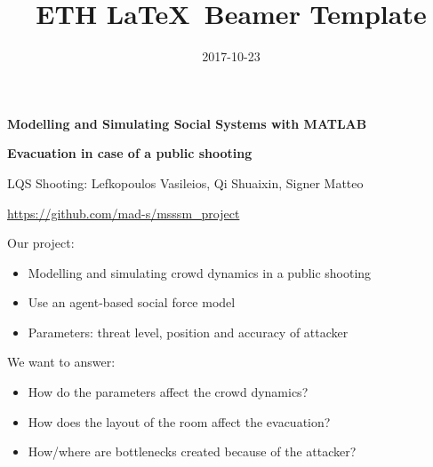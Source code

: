 \documentclass[aspectratio=43,11pt]{beamer}
\title{ETH \LaTeX\ Beamer Template}
\date{2017-10-23}
\begin{document}
\begin{frame}

\begin{center}
	{\bfseries Modelling and Simulating Social Systems with MATLAB}

	{\bfseries Evacuation in case of a public shooting}
	
	{LQS Shooting: Lefkopoulos Vasileios, Qi Shuaixin, Signer Matteo}
	
	\url{https://github.com/mad-s/msssm_project}
\end{center}

Our project:
\begin{itemize}
	\item Modelling and simulating crowd dynamics in a public shooting
	\item Use an agent-based social force model
	\item Parameters: threat level, position and accuracy of attacker
\end{itemize}

We want to answer:
\begin{itemize}
	\item How do the parameters affect the crowd dynamics?
	\item How does the layout of the room affect the evacuation?
	\item How/where are bottlenecks created because of the attacker?
\end{itemize}

\end{frame}
\end{document}
